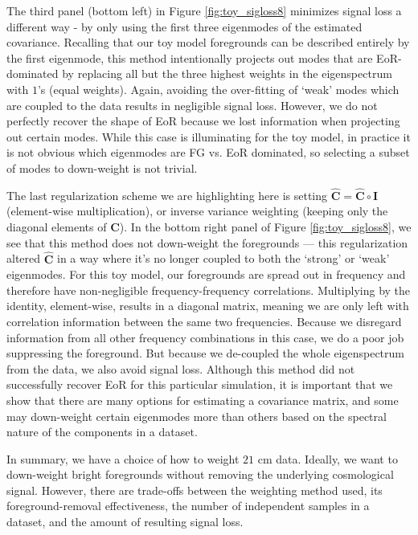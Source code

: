 \documentclass[preprint2,numberedappendix,tighten]{aastex6}  %
\begin{document}
The third panel (bottom left) in Figure \ref{fig:toy_sigloss8} minimizes signal loss a different way - 
by only using the first three eigenmodes of the estimated covariance. Recalling that our toy model foregrounds can be described entirely by the first eigenmode, this 
method intentionally projects out modes that are EoR-dominated by replacing all but the three highest weights in the 
eigenspectrum with $1$'s (equal weights). Again, avoiding the over-fitting of `weak' modes which are coupled to the data results in negligible signal loss. However, we do 
not perfectly recover the shape of EoR because we lost information when projecting out certain modes. While this case is illuminating for the toy model, in practice it is not obvious which eigenmodes are FG vs. EoR dominated, so selecting a subset of modes to down-weight is not trivial. 

The last regularization scheme we are highlighting here is setting $\widehat{\textbf{C}} = \widehat{\textbf{C}} \circ \textbf{I}$ (element-wise multiplication), or inverse variance weighting (keeping only the diagonal elements of $\widehat{\textbf{C}}$). In the bottom right 
panel of Figure \ref{fig:toy_sigloss8}, we see that this method does not down-weight the foregrounds --- this regularization altered $\widehat{\textbf{C}}$ in a way where it's no longer coupled to both the `strong' or `weak' eigenmodes. For this toy model, 
our foregrounds are spread out in frequency and therefore have non-negligible frequency-frequency correlations. Multiplying by 
the identity, element-wise, results in a diagonal matrix, meaning we are only left with correlation information between the same 
two frequencies. Because we disregard information from all other frequency combinations in this case, we do a poor job 
suppressing the foreground. But because we de-coupled the whole eigenspectrum from the data, we also avoid signal loss. Although this method did not successfully recover EoR for this particular simulation, it is important that we show that there 
are many options for estimating a covariance matrix, and some may down-weight certain eigenmodes more than others based on the spectral nature 
of the components in a dataset. 

In summary, we have a choice of how to weight $21$ cm data. Ideally, we want to down-weight bright foregrounds without 
removing the underlying cosmological signal. However, there are trade-offs between the weighting method 
used, its foreground-removal effectiveness, the number of independent samples in a dataset, and the amount of resulting signal loss. 
\end{document}
